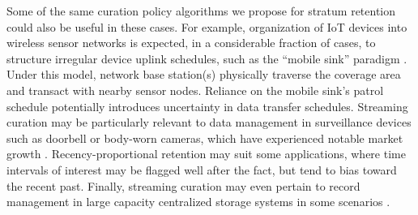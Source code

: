 

Some of the same curation policy algorithms we propose for stratum retention could also be useful in these cases.
For example, organization of IoT devices into wireless sensor networks is expected, in a considerable fraction of cases, to structure irregular device uplink schedules, such as the ``mobile sink'' paradigm \citep{jain2022survey}.
Under this model, network base station(s) physically traverse the coverage area and transact with nearby sensor nodes.
Reliance on the mobile sink's patrol schedule potentially introduces uncertainty in data transfer schedules.
Streaming curation may be particularly relevant to data management in surveillance devices such as doorbell or body-worn cameras, which have experienced notable market growth \citep{calacci2022cop,lum2019research}.
Recency-proportional retention may suit some applications, where time intervals of interest may be flagged well after the fact, but tend to bias toward the recent past.
Finally, streaming curation may even pertain to record management in large capacity centralized storage systems in some scenarios \citep{bhat2018data}.

